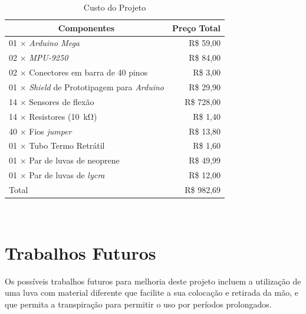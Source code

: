 \begin{table}[H]
  \centering
  \footnotesize
  \setlength{\abovecaptionskip}{0pt}
  \setlength{\belowcaptionskip}{0pt}
  \caption[Custo do Projeto]{Custo do Projeto}
  \label{tab:custos}
  \begin{tabular}{l r}
    \hline\hline
    \multicolumn{1}{c}{Componentes}&\multicolumn{1}{c}{Preço Total}\\
    \hline
    01 $\times$ \textit{Arduino Mega}                                 & R\$ 59,00 \\
    02 $\times$ \textit{MPU-9250}                                     & R\$ 84,00 \\
    02 $\times$ Conectores em barra de 40 pinos                       & R\$ 3,00 \\
    01 $\times$ \textit{Shield} de Prototipagem para \textit{Arduino} & R\$ 29,90 \\
    14 $\times$ Sensores de flexão                                    & R\$ 728,00 \\
    14 $\times$ Resistores (\SI{10}{\kilo\ohm})                       & R\$ 1,40 \\
    40 $\times$ Fios \textit{jumper}                                  & R\$ 13,80 \\
    01 $\times$ Tubo Termo Retrátil                                   & R\$ 1,60 \\
    01 $\times$ Par de luvas de neoprene                              & R\$ 49,99 \\
    01 $\times$ Par de luvas de \textit{lycra}                        & R\$ 12,00 \\
    \hline
    Total                                                             & R\$ 982,69 \\
    \hline\hline
  \end{tabular}
  \\\vspace{1.3mm}
\end{table}

\section{Trabalhos Futuros} %
\label{sec:trabFut}
Os possíveis trabalhos futuros para melhoria deste projeto incluem a utilização de uma luva com material diferente que facilite a sua colocação e retirada da mão, e que permita a transpiração para permitir o uso por períodos prolongados. 

